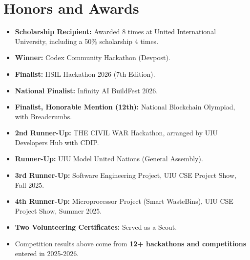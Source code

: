 \documentclass[10pt,a4paper]{article}
\begin{document}
\section{Honors and Awards}
\begin{itemize}
  \item \textbf{Scholarship Recipient:} Awarded 8 times at United International University, including a 50\% scholarship 4 times.
  \item \textbf{Winner:} Codex Community Hackathon (Devpost).
  \item \textbf{Finalist:} HSIL Hackathon 2026 (7th Edition).
  \item \textbf{National Finalist:} Infinity AI BuildFest 2026.
  \item \textbf{Finalist, Honorable Mention (12th):} National Blockchain Olympiad, with Breadcrumbs.
  \item \textbf{2nd Runner-Up:} THE CIVIL WAR Hackathon, arranged by UIU Developers Hub with CDIP.
  \item \textbf{Runner-Up:} UIU Model United Nations (General Assembly).
  \item \textbf{3rd Runner-Up:} Software Engineering Project, UIU CSE Project Show, Fall 2025.
  \item \textbf{4th Runner-Up:} Microprocessor Project (Smart WasteBins), UIU CSE Project Show, Summer 2025.
  \item \textbf{Two Volunteering Certificates:} Served as a Scout.
  \item Competition results above come from \textbf{12+ hackathons and competitions} entered in 2025-2026.
\end{itemize}
\end{document}
